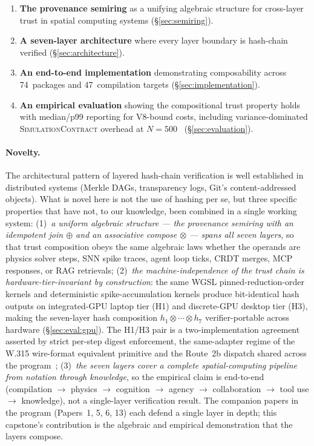 \documentclass[sigchi-a]{acmart}
\newcommand{\simcontract}{\textsc{SimulationContract}}
\begin{document}
\begin{enumerate}
  \item \textbf{The provenance semiring} as a unifying algebraic structure
    for cross-layer trust in spatial computing systems (\S\ref{sec:semiring}).
  \item \textbf{A seven-layer architecture} where every layer boundary
    is hash-chain verified (\S\ref{sec:architecture}).
  \item \textbf{An end-to-end implementation} demonstrating composability
    across 74~packages and 47~compilation targets (\S\ref{sec:implementation}).
  \item \textbf{An empirical evaluation} showing the compositional trust
    property holds with median/p99 reporting for V8-bound costs, including
    variance-dominated \simcontract{} overhead at $N{=}500$~\cite{mcp-trust-paper}
    (\S\ref{sec:evaluation}).
\end{enumerate}

\paragraph{Novelty.}
The architectural pattern of layered hash-chain verification is well established
in distributed systems (Merkle DAGs, transparency logs, Git's content-addressed
objects). What is novel here is not the use of hashing per se, but three
specific properties that have not, to our knowledge, been combined in a single
working system: (1)~\emph{a uniform algebraic structure --- the provenance
semiring with an idempotent join $\oplus$ and an associative compose $\otimes$
--- spans all seven layers}, so that trust composition obeys the same algebraic
laws whether the operands are physics solver steps, SNN spike traces, agent
loop ticks, CRDT merges, MCP responses, or RAG retrievals; (2)~\emph{the
machine-independence of the trust chain is hardware-tier-invariant by
construction}: the same WGSL pinned-reduction-order kernels and deterministic
spike-accumulation kernels produce bit-identical hash outputs on
integrated-GPU laptop tier (H1) and discrete-GPU desktop tier (H3),
making the seven-layer hash composition $h_1 \otimes \cdots \otimes h_7$
verifier-portable across hardware (\S\ref{sec:eval:gpu}). The H1/H3
pair is a two-implementation agreement asserted by strict per-step
digest enforcement, the same-adapter regime of the W.315 wire-format
equivalent primitive and the Route~2b dispatch shared across the
program~\cite{paper-0c-twin-test-2026-05-11}; (3)~\emph{the seven
layers cover a complete spatial-computing pipeline from notation through
knowledge}, so the empirical claim is end-to-end (compilation $\to$ physics
$\to$ cognition $\to$ agency $\to$ collaboration $\to$ tool use $\to$
knowledge), not a single-layer verification result. The companion papers in
the program (Papers~1, 5, 6, 13) each defend a single layer in depth; this
capstone's contribution is the algebraic and empirical demonstration that
the layers compose.
\end{document}
